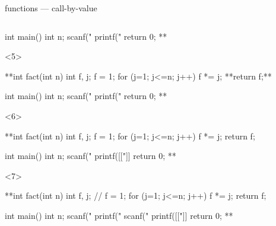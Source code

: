 \documentclass[10pt,t,svgnames]{beamer}
\begin{document}
\begin{frame}[fragile]{functions --- call-by-value}
\begin{columns}
\begin{column}{.6\textwidth}
\begin{scriptsize}
\begin{onlyenv}
\begin{codeblock}[firstnumber=5, gobble=8]
              int main() {
                int n;
                scanf("%
                printf("%
                return 0;
              }**
            \end{codeblock}
          \end{onlyenv}
          \begin{onlyenv}<5>
            \begin{codeblock}[firstnumber=5, gobble=8]
              **int fact(int n) {
                int f, j;
                f = 1;
                for (j=1; j<=n; j++) {
                  f *= j;
                }
                **return f;**
              }

              int main() {
                int n;
                scanf("%
                printf("%
                return 0;
              }**
            \end{codeblock}
          \end{onlyenv}
          \begin{onlyenv}<6>
            \begin{codeblock}[firstnumber=5, gobble=8]
              **int fact(int n) {
                int f, j;
                f = 1;
                for (j=1; j<=n; j++) {
                  f *= j;
                }
                return f;
              }

              int main() {
                int n;
                scanf("%
                printf([["]]%
                return 0;
              }**
            \end{codeblock}
          \end{onlyenv}
          \begin{onlyenv}<7>
            \begin{codeblock}[firstnumber=5, gobble=8]
              **int fact(int n) {
                int f, j;
                // f = 1;
                for (j=1; j<=n; j++) {
                  f *= j;
                }
                return f;
              }

              int main() {
                int n;
                scanf("%
                printf("%
                scanf("%
                printf([["]]%
                return 0;
              }**
            \end{codeblock}
          \end{onlyenv}
        \end{scriptsize}
      \end{column}


\end{columns}
\end{frame}
\end{document}
